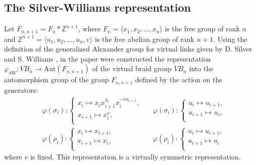 \documentclass[11 pt, reqno]{amsart}
\theoremstyle{definition}
\numberwithin{equation}{subsection}
\begin{document}


\subsection{The Silver-Williams representation}\label{SS: The Silver-Williams representation}
Let $F_{n,n+1} = F_n \ast \mathbb{Z}^{n+1}$, where $F_n=\langle x_1, x_2, \ldots,x_n \rangle$ is the free group of rank $n$ and
$\mathbb{Z}^{n+1} = \langle u_1, u_2, \ldots, u_n, v \rangle$ is the free abelian group of rank $n+1$.
Using the definition of the generalized Alexander group for virtual links given by D. Silver and S. Williams \cite{SW-1},
in the paper  \cite{BMN-1} were constructed  the representation
$\varphi_{SW} : VB_n \longrightarrow \mathrm{Aut}(F_{n,n+1})$ of the virtual braid group $VB_n$ into the automorphism group
of the group $F_{n,n+1}$ defined by the action on the generators:
\begin{align*}
&\varphi(\sigma_i) :
\left\{
\begin{array}{l}
  x_i \mapsto  x_i x_{i+1}^{u_i} x_i^{-vu_{i+1}}, \\
  x_{i+1} \mapsto x_i^v,  \\
\end{array}
\right.~~~
&\varphi(\sigma_i) :
\left\{
\begin{array}{l}
  u_i \mapsto  u_{i+1}, \\
  u_{i+1} \mapsto u_i,  \\
\end{array}
\right.\\
&\varphi(\rho_i) :
\left\{
\begin{array}{l}
  x_i \mapsto  x_{i+1}, \\
  x_{i+1} \mapsto x_i,  \\
\end{array}
\right.~~~
&\varphi(\rho_i) :
\left\{
\begin{array}{l}
  u_i \mapsto  u_{i+1}, \\
  u_{i+1} \mapsto u_i \\
\end{array}
\right.
\end{align*}
where $v$ is fixed.
This representation is a virtually symmetric representation.
\end{document}
